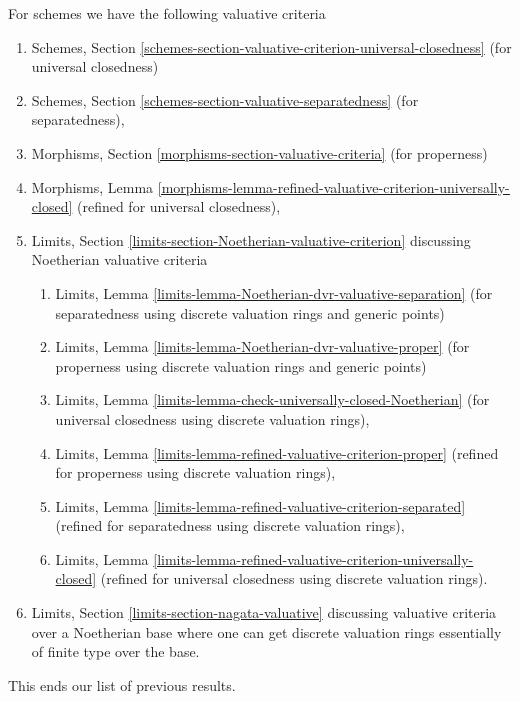 For schemes we have the following valuative criteria
\begin{enumerate}
\item Schemes, Section
\ref{schemes-section-valuative-criterion-universal-closedness}
(for universal closedness)
\item Schemes, Section \ref{schemes-section-valuative-separatedness}
(for separatedness),
\item Morphisms, Section \ref{morphisms-section-valuative-criteria}
(for properness)
\item Morphisms, Lemma
\ref{morphisms-lemma-refined-valuative-criterion-universally-closed}
(refined for universal closedness),
\item Limits, Section \ref{limits-section-Noetherian-valuative-criterion}
discussing Noetherian valuative criteria
\begin{enumerate}
\item Limits, Lemma \ref{limits-lemma-Noetherian-dvr-valuative-separation}
(for separatedness using discrete valuation rings and generic points)
\item Limits, Lemma \ref{limits-lemma-Noetherian-dvr-valuative-proper}
(for properness using discrete valuation rings and generic points)
\item Limits, Lemma \ref{limits-lemma-check-universally-closed-Noetherian}
(for universal closedness using discrete valuation rings),
\item Limits, Lemma \ref{limits-lemma-refined-valuative-criterion-proper}
(refined for properness using discrete valuation rings),
\item Limits, Lemma \ref{limits-lemma-refined-valuative-criterion-separated}
(refined for separatedness using discrete valuation rings),
\item Limits, Lemma
\ref{limits-lemma-refined-valuative-criterion-universally-closed}
(refined for universal closedness using discrete valuation rings).
\end{enumerate}
\item Limits, Section \ref{limits-section-nagata-valuative}
discussing valuative criteria over a Noetherian base where
one can get discrete valuation rings essentially of finite type
over the base.
\end{enumerate}
This ends our list of previous results.

